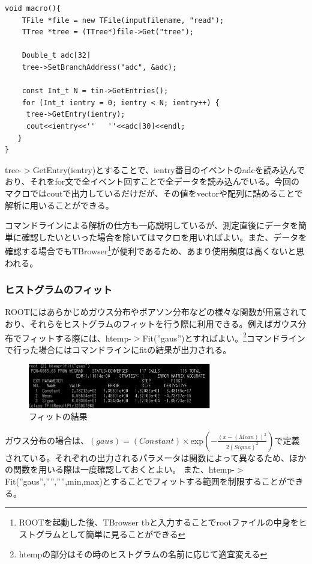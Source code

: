 \documentclass[10pt]{ujarticle}
\begin{document}
\begin{lstlisting}[basicstyle=\ttfamily\footnotesize, frame=single]
void macro(){
    TFile *file = new TFile(inputfilename, "read"); 
    TTree *tree = (TTree*)file->Get("tree");
 
    Double_t adc[32]
    tree->SetBranchAddress("adc", &adc);
 
    const Int_t N = tin->GetEntries();
    for (Int_t ientry = 0; ientry < N; ientry++) {
     tree->GetEntry(ientry);    
     cout<<ientry<<''   ''<<adc[30]<<endl;
   }
}
 \end{lstlisting}

tree-$>$GetEntry(ientry)とすることで、ientry番目のイベントのadcを読み込んでおり、それをfor文で全イベント回すことで全データを読み込んでいる。今回のマクロではcoutで出力しているだけだが、その値をvectorや配列に詰めることで解析に用いることができる。

コマンドラインによる解析の仕方も一応説明しているが、測定直後にデータを簡単に確認したいといった場合を除いてはマクロを用いればよい。また、データを確認する場合でもTBrowser\footnote{ROOTを起動した後、TBrowser tbと入力することでrootファイルの中身をヒストグラムとして簡単に見ることができる}が便利であるため、あまり使用頻度は高くないと思われる。

\subsubsection{ヒストグラムのフィット}
ROOTにはあらかじめガウス分布やポアソン分布などの様々な関数が用意されており、それらをヒストグラムのフィットを行う際に利用できる。例えばガウス分布でフィットする際には、htemp-$>$Fit(''gaus'')とすればよい。\footnote{htempの部分はその時のヒストグラムの名前に応じて適宜変える}コマンドラインで行った場合にはコマンドラインにfitの結果が出力される。
\begin{figure}[h]
\begin{center}
\includegraphics[width=8cm]{SummerChallenge_fit_gaus.png}
\caption{フィットの結果}
\label{fig:fit_gaus}
\end{center}
\end{figure}

ガウス分布の場合は、$(gaus)=(Constant)\times$exp$(-\frac{(x-(Mean))^2}{2(Sigma)^2})$で定義されている。それぞれの出力されるパラメータは関数によって異なるため、ほかの関数を用いる際は一度確認しておくとよい。
また、htemp-$>$Fit(''gaus'','''','''',min,max)とすることでフィットする範囲を制限することができる。
\end{document}
